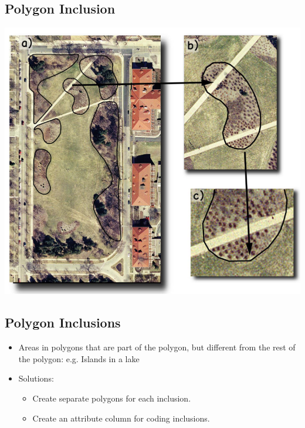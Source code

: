 \documentclass[11pt]{article}
\theoremstyle{definition}
\begin{document}
\subsection{Polygon Inclusion}
\includegraphics[width=\textwidth/2]{26.png}

\subsection{Polygon Inclusions}
\begin{itemize}
    \item Areas in polygons that are part of the
    polygon, but different from the rest of the
    polygon: e.g. Islands in a lake
    \item Solutions:
    \begin{itemize}
        \item Create separate polygons for each inclusion.
        \item Create an attribute column for coding
        inclusions.
    \end{itemize}
\end{itemize}
\end{document}

